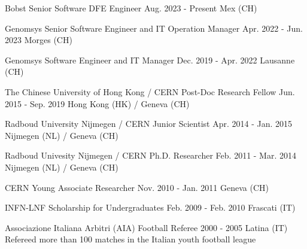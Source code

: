
\begin{cventries}
\cventry
{Bobst} %
{Senior Software DFE Engineer} %
{Aug. 2023 - Present} %
{Mex (CH)} %
{\Bobst}

\cventry
{Genomsys} %
{Senior Software Engineer and IT Operation Manager} %
{Apr. 2022 - Jun. 2023} %
{Morges (CH)} %
{\GenomsysSenior}

\cventry
{Genomsys} %
{Software Engineer and IT Manager} %
{Dec. 2019 - Apr. 2022} %
{Lausanne (CH)} %
{\Genomsys}

\cventry
{The Chinese University of Hong Kong / CERN} %
{Post-Doc Research Fellow} %
{Jun. 2015 - Sep. 2019} %
{Hong Kong (HK) / Geneva (CH)}
{\CHUK}

\cventry
{Radboud University Nijmegen / CERN} %
{Junior Scientist} %
{Apr. 2014 - Jan. 2015} %
{Nijmegen (NL) / Geneva (CH)} %
{\JuniorScientist}

\cventry
{Radboud Univesity Nijmegen / CERN} %
{Ph.D. Researcher} %
{Feb. 2011  - Mar. 2014} %
{Nijmegen (NL) / Geneva (CH)} %
{\Phd}

\cventry
{CERN} %
{Young Associate Researcher} %
{Nov. 2010 - Jan. 2011} %
{Geneva (CH)} %
{\CERN}

\cventry
{INFN-LNF} %
{Scholarship for Undergraduates} %
{Feb. 2009 - Feb. 2010} %
{Frascati (IT)} %
{\Master}

\cventry
{Associazione Italiana Arbitri (AIA)} %
{Football Referee} %
{2000 - 2005} %
{Latina (IT)} %
{Refereed more than 100 matches in the Italian youth football league}

\end{cventries}
